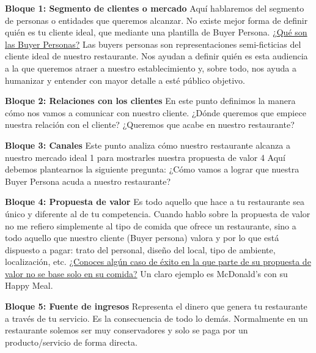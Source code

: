 \begin{enumerate}[1.]
\textbf {Bloque 1: Segmento de clientes o mercado} \newline
Aquí hablaremos del segmento de personas o entidades que queremos alcanzar. No existe mejor forma de definir quién es tu cliente ideal, que mediante una plantilla de Buyer Persona.\newline
\underline{¿Qué son las Buyer Personas?} \newline
Las buyers personas son representaciones semi-ficticias del cliente ideal de nuestro restaurante. Nos ayudan a definir quién es esta audiencia a la que queremos atraer a nuestro establecimiento y, sobre todo, nos ayuda a humanizar y entender con mayor detalle a esté público objetivo.\newline

\textbf{Bloque 2: Relaciones con los clientes}\newline
En este punto definimos la manera cómo nos vamos a comunicar con nuestro cliente.\newline
¿Dónde queremos que empiece nuestra relación con el cliente?\newline
¿Queremos que acabe en nuestro restaurante?\newline

\textbf{Bloque 3: Canales}\newline
Este punto analiza cómo nuestro restaurante alcanza a nuestro mercado ideal 1 para mostrarles nuestra propuesta de valor 4\newline
Aquí debemos plantearnos la siguiente pregunta: ¿Cómo vamos a lograr que nuestra Buyer Persona acuda a nuestro restaurante?\newline

\textbf{Bloque 4: Propuesta de valor}\newline
Es todo aquello que hace a tu restaurante sea único y diferente al de tu competencia.\newline
Cuando hablo sobre la propuesta de valor no me refiero simplemente al tipo de comida que ofrece un restaurante, sino a todo aquello que nuestro cliente (Buyer persona) valora y por lo que está dispuesto a pagar: trato del personal, diseño del local, tipo de ambiente, localización, etc.\newline
\underline{¿Conoces algún caso de éxito en la que parte de su propuesta de valor no se base solo en su comida?} \newline
Un claro ejemplo es McDonald’s con su Happy Meal.\newline

\textbf{Bloque 5: Fuente de ingresos}\newline
Representa el dinero que genera tu restaurante a través de tu servicio.\newline
Es la consecuencia de todo lo demás.\newline
Normalmente en un restaurante solemos ser muy conservadores y solo se paga por un producto/servicio de forma directa.\newline


\end{enumerate}
